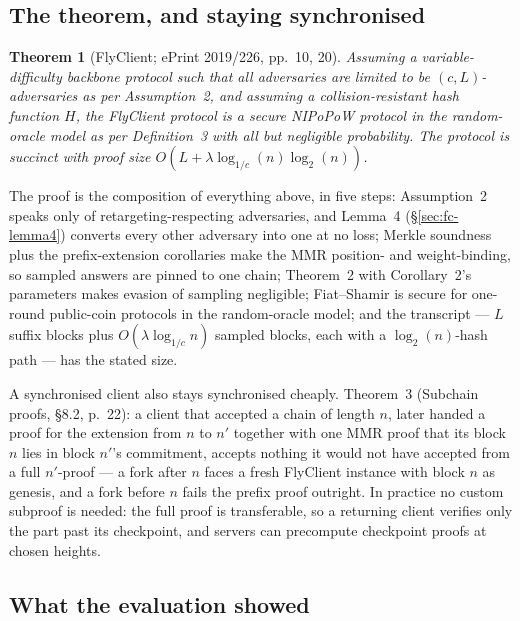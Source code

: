 \documentclass[11pt,a4paper]{article}
\theoremstyle{definition}
\begin{document}
\subsection{The theorem, and staying synchronised}\label{sec:fc-theorem}

\medskip
\noindent\textbf{Theorem 1} (FlyClient; ePrint 2019/226, pp.~10, 20).
\emph{Assuming a variable-difficulty backbone protocol such that all
adversaries are limited to be $(c, L)$-adversaries as per Assumption~2,
and assuming a collision-resistant hash function $H$, the FlyClient
protocol is a secure NIPoPoW protocol in the random-oracle model as per
Definition~3 with all but negligible probability. The protocol is
succinct with proof size $O(L + \lambda \log_{1/c}(n) \log_2(n))$.}
\medskip

The proof is the composition of everything above, in five steps:
Assumption~2 speaks only of retargeting-respecting adversaries, and
Lemma~4 (\S\ref{sec:fc-lemma4}) converts every other adversary into one
at no loss; Merkle soundness plus the prefix-extension corollaries make
the MMR position- and weight-binding, so sampled answers are pinned to
one chain; Theorem~2 with Corollary~2's parameters makes evasion of
sampling negligible; Fiat--Shamir is secure for one-round public-coin
protocols in the random-oracle model; and the transcript --- $L$ suffix
blocks plus $O(\lambda \log_{1/c} n)$ sampled blocks, each with a
$\log_2(n)$-hash path --- has the stated size.

A synchronised client also stays synchronised cheaply. Theorem~3
(Subchain proofs, \S8.2, p.~22): a client that accepted a chain of length
$n$, later handed a proof for the extension from $n$ to $n'$ together
with one MMR proof that its block $n$ lies in block $n'$'s commitment,
accepts nothing it would not have accepted from a full $n'$-proof --- a
fork after $n$ faces a fresh FlyClient instance with block $n$ as
genesis, and a fork before $n$ fails the prefix proof outright. In
practice no custom subproof is needed: the full proof is transferable, so
a returning client verifies only the part past its checkpoint, and
servers can precompute checkpoint proofs at chosen heights.

\subsection{What the evaluation showed}\label{sec:fc-eval}
\end{document}
